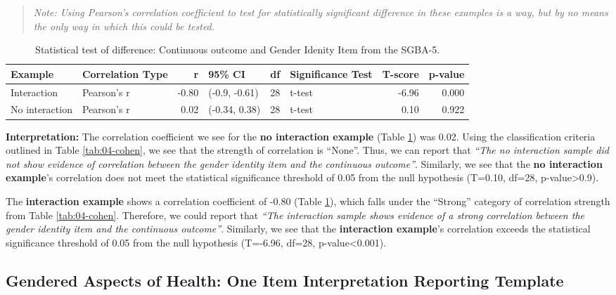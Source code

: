 \documentclass[
]{book}
\begin{document}
\begin{quote}
\emph{Note: Using Pearson's correlation coefficient to test for statistically significant difference in these examples is a way, but by no means the only way in which this could be tested.}
\end{quote}

\begin{table}

\caption{\label{tab:04-tab-r}Statistical test of difference: Continuous outcome and Gender Idenity Item from the SGBA-5.}
\centering
\begin{tabular}[t]{llrlrlrr}
\toprule
Example & Correlation Type & r & 95\% CI & df & Significance Test & T-score & p-value\\
\midrule
Interaction & Pearson's r & -0.80 & (-0.9, -0.61) & 28 & t-test & -6.96 & 0.000\\
No interaction & Pearson's r & 0.02 & (-0.34, 0.38) & 28 & t-test & 0.10 & 0.922\\
\bottomrule
\end{tabular}
\end{table}

\textbf{Interpretation:} The correlation coefficient we see for the \textbf{no interaction example} (Table \ref{tab:04-tab-r}) was 0.02. Using the classification criteria outlined in Table \ref{tab:04-cohen}, we see that the strength of correlation is ``None''. Thus, we can report that {\emph{``The no interaction sample did not show evidence of correlation between the gender identity item and the continuous outcome''}}. Similarly, we see that the \textbf{no interaction example}'s correlation does not meet the statistical significance threshold of 0.05 from the null hypothesis (T=0.10, df=28, p-value\textgreater0.9).

The \textbf{interaction example} shows a correlation coefficient of -0.80 (Table \ref{tab:04-tab-r}), which falls under the ``Strong'' category of correlation strength from Table \ref{tab:04-cohen}. Therefore, we could report that {\emph{``The interaction sample shows evidence of a strong correlation between the gender identity item and the continuous outcome''}}. Similarly, we see that the \textbf{interaction example}'s correlation exceeds the statistical significance threshold of 0.05 from the null hypothesis (T=-6.96, df=28, p-value\textless0.001).

\subsection{Gendered Aspects of Health: One Item Interpretation Reporting Template}\label{gendered-aspects-of-health-one-item-interpretation-reporting-template}
\end{document}
